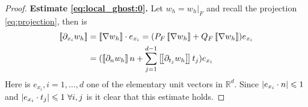 \begin{proof}
\textbf{Estimate \eqref{eq:local_ghost:0}.} Let $w_{h} = w_{h}|_F$ and recall the projection \eqref{eq:projection}, then is
\begin{equation}
    \begin{split}
\jump{ \partial _{x_{i}} w_{h}} & = \jump{ \nabla w_{h} }   \cdot e_{x_{i}}  = ( P_{F} \jump{ \nabla w_{h} }   + Q_{F}  \jump{ \nabla w_{h} }   )e_{x_{i}} \\
 &   = ( \jump{\partial _{n}    w_{h} }    n + \sum_{j=1}^{d-1}  \jump{\partial_{ t_{j} } w_{h} }    t_{j} )e_{x_{i}}
    \end{split}
\end{equation}
Here is $e_{x_{i}}, i= 1,\ldots,d$ one of the elementary unit vectors in $\mathbb{R} ^{d}$.
Since $\left\lvert e_{x_{i}} \cdot n   \right\rvert\leqslant 1 $ and $\abs{e_{x_{i}} \cdot  t_{j} }\le 1 \ \forall i,j $ is it clear that this estimate holds.


\end{proof}
